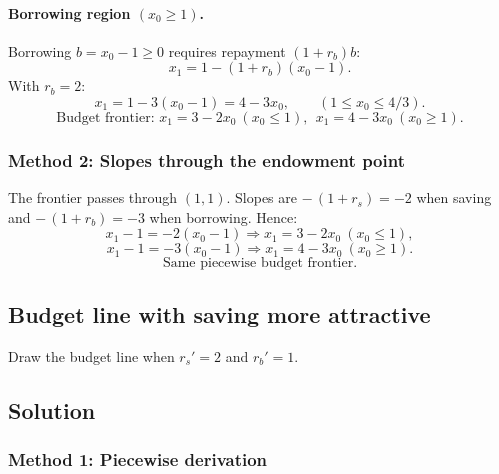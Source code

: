 \documentclass[12pt]{article}
\begin{document}
\paragraph{Borrowing region \((x_0\ge 1)\).}
Borrowing \(b=x_0-1\ge 0\) requires repayment \((1+r_b)b\):
\[
x_1=1-(1+r_b)(x_0-1).
\]
With \(r_b=2\):
\[
x_1=1-3(x_0-1)=4-3x_0,\qquad (1\le x_0\le 4/3).
\]
\[
\boxed{\;\text{Budget frontier: }x_1=3-2x_0\ (x_0\le 1),\ \ x_1=4-3x_0\ (x_0\ge 1).\;}
\]

\subsubsection*{Method 2: Slopes through the endowment point}
The frontier passes through \((1,1)\). Slopes are \(-\,(1+r_s)=-2\) when saving and \(-\,(1+r_b)=-3\) when borrowing. Hence:
\[
x_1-1=-2(x_0-1)\Rightarrow x_1=3-2x_0\ (x_0\le 1),
\]
\[
x_1-1=-3(x_0-1)\Rightarrow x_1=4-3x_0\ (x_0\ge 1).
\]
\[
\boxed{\;\text{Same piecewise budget frontier.}\;}
\]

\subsection{Budget line with saving more attractive}
Draw the budget line when \(r_s'=2\) and \(r_b'=1\).

\subsection*{Solution}
\subsubsection*{Method 1: Piecewise derivation}
\end{document}
